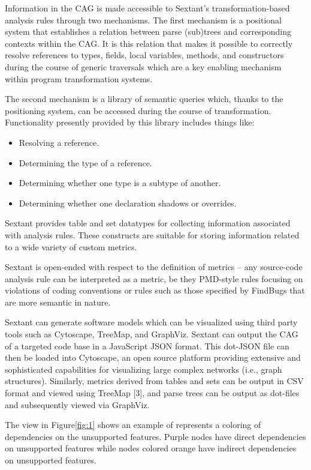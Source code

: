Information in the CAG is made accessible to Sextant’s transformation-based analysis rules through two mechanisms. The first mechanism is a positional system that establishes a relation between parse (sub)trees and corresponding contexts within the CAG. It is this relation that makes it possible to
correctly resolve references to types, fields, local variables, methods, and constructors during the course of generic traversals which are a key enabling mechanism within program transformation systems.

The second mechanism is a library of semantic queries which, thanks to the positioning system, can be accessed during the course of transformation. Functionality presently provided by this library includes things like:
\begin{itemize}
	\item Resolving a reference.
	\item Determining the type of a reference.
	\item Determining whether one type is a subtype of another.
	\item Determining whether one declaration shadows or overrides.
\end{itemize}
 
Sextant provides table and set datatypes for collecting information associated with analysis rules. These constructs are suitable for storing information related to a wide variety of custom metrics.

Sextant is open-ended with respect to the definition of metrics – any source-code analysis rule can be interpreted as a metric, be they PMD-style rules focusing on violations of coding conventions or rules such as those specified by FindBugs that are more semantic in nature.

Sextant can generate software models which can be visualized using third party tools such as Cytoscape, TreeMap, and GraphViz. Sextant can output the CAG of a targeted code base in a JavaScript JSON format. This dot-JSON file can then be loaded into Cytoscape, an open source platform providing
extensive and sophisticated capabilities for visualizing large complex networks (i.e., graph structures). Similarly, metrics derived from tables and sets can be output in CSV format and viewed using TreeMap [3], and parse trees can be output as dot-files and subsequently viewed via GraphViz.

The view in Figure\ref{fig:1} shows an example of represents a coloring of
dependencies on the unsupported features. Purple nodes have direct dependencies on unsupported features while nodes colored orange have indirect dependencies on unsupported features.


